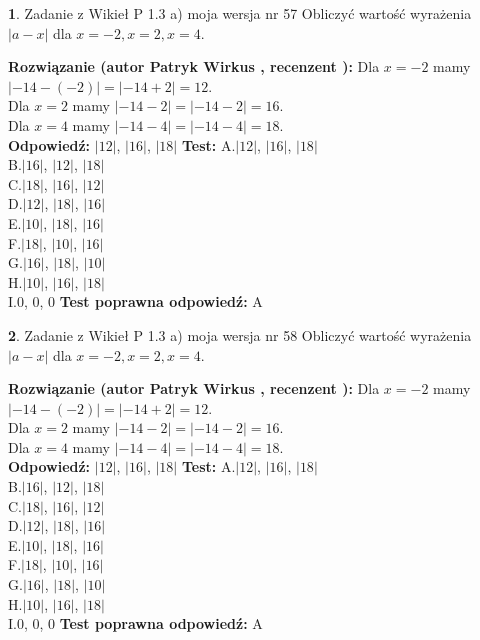 \documentclass[12pt, a4paper]{article}
\theoremstyle{definition} %
\newtheorem{zad}{}
\newcommand{\zadStart}[1]{\begin{zad}#1\newline}
\newcommand{\zadStop}{\end{zad}}
\newcommand{\rozwStart}[2]{\noindent \textbf{Rozwiązanie (autor #1 , recenzent #2): }\newline}
\newcommand{\rozwStop}{\newline}
\newcommand{\odpStart}{\noindent \textbf{Odpowiedź:}\newline}
\newcommand{\odpStop}{\newline}
\newcommand{\testStart}{\noindent \textbf{Test:}\newline}
\newcommand{\testStop}{\newline}
\newcommand{\kluczStart}{\noindent \textbf{Test poprawna odpowiedź:}\newline}
\newcommand{\kluczStop}{\newline}
\begin{document}
\zadStart{Zadanie z Wikieł P 1.3 a) moja wersja nr 57}
Obliczyć wartość wyrażenia $|a - x|$ dla $x=-2,x=2,x=4$.
\zadStop
\rozwStart{Patryk Wirkus}{}
Dla $x = -2$ mamy $|-14 - (-2)| = |-14 + 2| = 12$.\\
Dla $x = 2$ mamy $|-14 - 2| = |-14 - 2| = 16$.\\
Dla $x = 4$ mamy $|-14 - 4| = |-14 - 4| = 18$.\\
\rozwStop
\odpStart
$|12|$, $|16|$, $|18|$
\odpStop
\testStart
A.$|12|$, $|16|$, $|18|$\\
B.$|16|$, $|12|$, $|18|$\\
C.$|18|$, $|16|$, $|12|$\\
D.$|12|$, $|18|$, $|16|$\\
E.$|10|$, $|18|$, $|16|$\\
F.$|18|$, $|10|$, $|16|$\\
G.$|16|$, $|18|$, $|10|$\\
H.$|10|$, $|16|$, $|18|$\\
I.$0$, $0$, $0$
\testStop
\kluczStart
A
\kluczStop



\zadStart{Zadanie z Wikieł P 1.3 a) moja wersja nr 58}
Obliczyć wartość wyrażenia $|a - x|$ dla $x=-2,x=2,x=4$.
\zadStop
\rozwStart{Patryk Wirkus}{}
Dla $x = -2$ mamy $|-14 - (-2)| = |-14 + 2| = 12$.\\
Dla $x = 2$ mamy $|-14 - 2| = |-14 - 2| = 16$.\\
Dla $x = 4$ mamy $|-14 - 4| = |-14 - 4| = 18$.\\
\rozwStop
\odpStart
$|12|$, $|16|$, $|18|$
\odpStop
\testStart
A.$|12|$, $|16|$, $|18|$\\
B.$|16|$, $|12|$, $|18|$\\
C.$|18|$, $|16|$, $|12|$\\
D.$|12|$, $|18|$, $|16|$\\
E.$|10|$, $|18|$, $|16|$\\
F.$|18|$, $|10|$, $|16|$\\
G.$|16|$, $|18|$, $|10|$\\
H.$|10|$, $|16|$, $|18|$\\
I.$0$, $0$, $0$
\testStop
\kluczStart
A
\kluczStop
\end{document}
